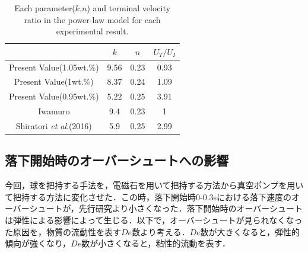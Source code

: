 \begin{table}[h]
    \centering
    \caption{Each parameter($k$,$n$) and terminal velocity ratio in the power-law model for each experimental result.}
    \label{table:UT}
    \begin{tabular}{c|c|c|c} \hline
        & $k$ & $n$ & $U_T/U_{I}$ \\ \hline \hline
        Present Value(1.05wt.\%) & 9.56 & 0.23 & 0.93\\
        Present Value(1wt.\%) & 8.37 & 0.24 & 1.09\\
        Present Value(0.95wt.\%) & 5.22 & 0.25 & 3.91\\
        Iwamuro\cite{ref:8} & 9.4 & 0.23 & 1\\
        Shiratori \textit{et al}.(2016)\cite{ref:10} & 5.9 & 0.25 & 2.99\\ \hline
    \end{tabular}
\end{table}

\newpage

\subsection{落下開始時のオーバーシュートへの影響}
\label{sec:dis-de}

今回，球を把持する手法を，電磁石を用いて把持する方法から真空ポンプを用いて把持する方法に変化させた．この時，落下開始時0-0.3sにおける落下速度のオーバーシュートが，先行研究\cite{ref:8,ref:9}より小さくなった．落下開始時のオーバーシュートは弾性による影響によって生じる\cite{ref:12}．以下で，オーバーシュートが見られなくなった原因を，物質の流動性を表す$De$数より考える．$De$数が大きくなると，弾性的傾向が強くなり，$De$数が小さくなると，粘性的流動を表す．


